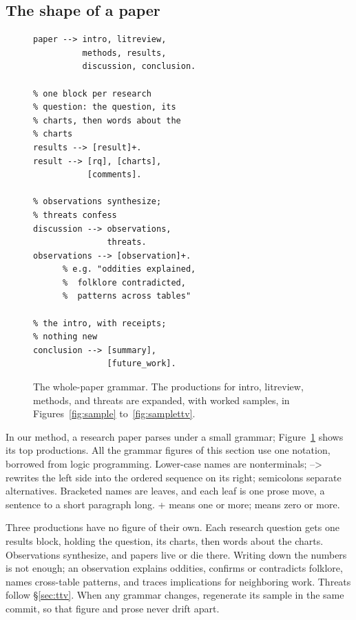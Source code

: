 \subsection{The shape of a paper}
\label{sec:other}

\begin{figure}[t]
\begin{lstlisting}[style=dcg]
paper --> intro, litreview,
          methods, results,
          discussion, conclusion.

% one block per research
% question: the question, its
% charts, then words about the
% charts
results --> [result]+.
result --> [rq], [charts],
           [comments].

% observations synthesize;
% threats confess
discussion --> observations,
               threats.
observations --> [observation]+.
      % e.g. "oddities explained,
      %  folklore contradicted,
      %  patterns across tables"

% the intro, with receipts;
% nothing new
conclusion --> [summary],
               [future_work].
\end{lstlisting}
\caption{The whole-paper grammar.
The productions for {\ttfamily intro}, {\ttfamily litreview},
{\ttfamily methods}, and {\ttfamily threats} are expanded, with
worked samples, in Figures~\ref{fig:sample}
to~\ref{fig:samplettv}.}
\label{fig:paperbnf}
\end{figure}

In our method, a research paper parses under a small grammar;
Figure~\ref{fig:paperbnf} shows its top productions.
All the grammar figures of this section use one notation,
borrowed from logic programming.
Lower-case names are nonterminals; {\ttfamily -->} rewrites the
left side into the ordered sequence on its right; semicolons
separate alternatives.
Bracketed names are leaves, and each leaf is one prose move, a
sentence to a short paragraph long.
{\ttfamily +} means one or more; {\ttfamily *} means zero or
more.

Three productions have no figure of their own.
Each research question gets one results block, holding the
question, its charts, then words about the charts.
Observations synthesize, and papers live or die there.
Writing down the numbers is not enough; an observation explains
oddities, confirms or contradicts folklore, names cross-table
patterns, and traces implications for neighboring work.
Threats follow \S\ref{sec:ttv}.
When any grammar changes, regenerate its sample in the same
commit, so that figure and prose never drift apart.

